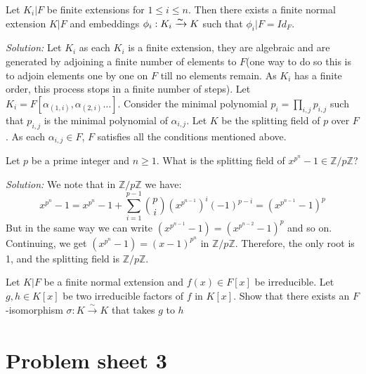 \documentclass[a4paper, 11pt]{article}
\newenvironment{solution}
    {\textit{Solution:}}
    {}
\begin{document}
\begin{tcolorbox}[colback=c2,colframe=c1,title=Problem 2.8]
    Let $K_i
| F$ be finite extensions for $1 \leq i \leq n$. Then there exists a finite normal
extension $K | F$ and embeddings $\phi_i
: K_i\xrightarrow{\thicksim} K$ such that $\phi_i
|F = Id_F$.
\end{tcolorbox}
\begin{solution}
    Let $K_i$ as each $K_i$ is a finite extension, they are algebraic and are generated by adjoining a finite number of elements to $F$(one way to do so this is to adjoin elements one by one on $F$ till no elements remain. As $K_i$ has a finite order, this process stops in a finite number of steps). Let $K_i=F[\alpha_{(1,i)},\alpha_{(2,i)}\hdots]$. Consider the minimal polynomial $p_i=\prod_{i,j} p_{i,j}$ such that $p_{i,j}$ is the minimal polynomial of $\alpha_{i,j}$. Let $K$ be the splitting field of $p$ over $F$. As each $\alpha_{i,j}\in F$, $F$ satisfies all the conditions mentioned above.      
\end{solution}




\begin{tcolorbox}[colback=c2,colframe=c1,title=Problem 2.9]
    Let $p$ be a prime integer and $n \geq 1$. What is the splitting field of $x^{p^n}-1\in\mathbb{Z}/p\mathbb{Z}$?
\end{tcolorbox}
\begin{solution}
    We note that in $\mathbb{Z}/p\mathbb{Z}$ we have:
    $$x^{p^n}-1=x^{p^n}-1+\sum_{i=1}^{p-1}{p\choose i}\left(x^{p^{n-1}}\right)^i(-1)^{p-i}=(x^{p^{n-1}}-1)^p$$
    But in the same way we can write $(x^{p^{n-1}}-1)=(x^{p^{n-2}}-1)^p$ and so on. Continuing, we get $(x^{p^{n}}-1)=(x-1)^{p^n}$ in $\mathbb Z/p\mathbb{Z}$. Therefore, the only root is 1, and the splitting field is $\mathbb{Z}/p\mathbb{Z}$.
\end{solution}





\begin{tcolorbox}[colback=c2,colframe=c1,title=Problem 2.10]
    Let $K | F$ be a finite normal extension and $f(x) \in F[x]$ be irreducible. Let $g, h \in K[x]$ be two irreducible factors of $f$ in $K[x]$. Show that there exists an $F$-isomorphism $\sigma : K\xrightarrow[]{\sim} K$ that  takes $g$ to $h$
\end{tcolorbox}


\section{Problem sheet 3}
\end{document}

